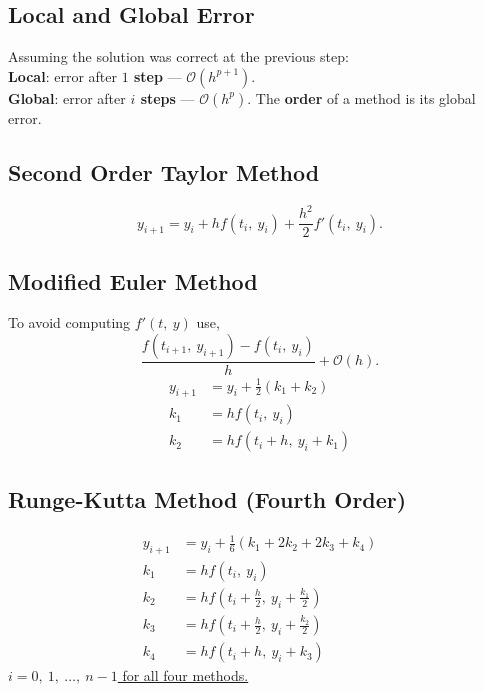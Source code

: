 \documentclass{article}
\begin{document}
\begin{multicols}{3}
    \subsection{Local and Global Error}
    Assuming the solution was correct at the previous step: \\
    \textbf{Local}: error after \textbf{\(1\) step} --- \(\mathcal{O}\left( h^{p + 1} \right)\). \\
    \textbf{Global}: error after \textbf{\(i\) steps} --- \(\mathcal{O}\left( h^p \right)\).
    The \textbf{order} of a method is its global error.
    \subsection{Second Order Taylor Method}
    \begin{equation*}
        y_{i + 1} = y_i + h f\left( t_i,\: y_i \right) + \frac{h^2}{2} f'\left( t_i,\: y_i \right).
    \end{equation*}
    \subsection{Modified Euler Method}
    To avoid computing \(f'\left( t,\: y \right)\) use,
    \begin{equation*}
        \frac{f\left( t_{i + 1},\: y_{i + 1} \right) - f\left( t_i,\: y_i \right)}{h} + \mathcal{O}\left( h \right).
    \end{equation*}
    \begin{align*}
        y_{i + 1} & = y_i + \frac{1}{2} \left( k_1 + k_2 \right) \\
        k_1       & = h f\left( t_i,\: y_i \right)               \\
        k_2       & = h f\left( t_i + h,\: y_i + k_1 \right)
    \end{align*}
    \subsection{Runge-Kutta Method (Fourth Order)}
    \begin{align*}
        y_{i + 1} & = y_i + \frac{1}{6} \left( k_1 + 2 k_2 + 2 k_3 + k_4 \right) \\
        k_1       & = h f\left( t_i,\: y_i \right)                               \\
        k_2       & = h f\left( t_i + \frac{h}{2},\: y_i + \frac{k_1}{2} \right) \\
        k_3       & = h f\left( t_i + \frac{h}{2},\: y_i + \frac{k_2}{2} \right) \\
        k_4       & = h f\left( t_i + h,\: y_i + k_3 \right)
    \end{align*}
    \underline{\(i = 0,\: 1,\: \ldots,\: n - 1\) for all four methods.}

\end{multicols}
\end{document}
